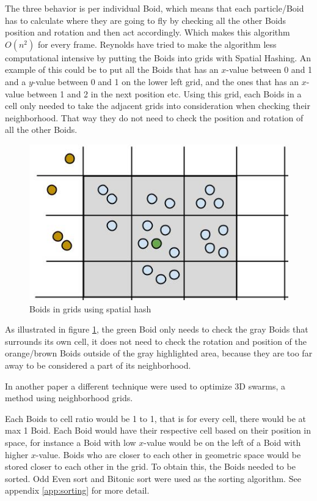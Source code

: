 The three behavior is per individual Boid, which means that each particle/Boid has to calculate where they are going to fly by checking all the other Boids position and rotation and then act accordingly. Which makes this algorithm $ O(n^2)$ for every frame. 
Reynolds have tried to make the algorithm less computational intensive by putting the Boids into grids with Spatial Hashing. An example of this could be to put all the Boids that has an $x$-value between 0 and 1 and a $y$-value between 0 and 1 on the lower left grid, and the ones that has an $x$-value between 1 and 2 in the next position etc. Using this grid, each Boids in a cell only needed to take the adjacent grids into consideration when checking their neighborhood. That way they do not need to check the position and rotation of all the other Boids.
\begin{figure}[h!]
    \centering
    \includegraphics[width=0.8\linewidth]{images/boid_spatialhash}
    \caption{Boids in grids using spatial hash} \label{fig:spatialhash}
\end{figure}
As illustrated in figure \ref{fig:spatialhash}, the green Boid only needs to check the gray Boids that surrounds its own cell, it does not need to check the rotation and position of the orange/brown Boids outside of the gray highlighted area, because they are too far away to be considered a part of its neighborhood.

In another paper \cite{Joselli2009} a different technique were used to optimize 3D swarms, a method using neighborhood grids.

Each Boids to cell ratio would be 1 to 1, that is for every cell, there would be at max 1 Boid. Each Boid would have their respective cell based on their position in space, for instance a Boid with low $x$-value would be on the left of a Boid with higher $x$-value. Boids who are closer to each other in geometric space would be stored closer to each other in the grid. To obtain this, the Boids needed to be sorted. Odd Even sort and Bitonic sort were used as the sorting algorithm. See appendix \ref{app:sorting} for more detail.

